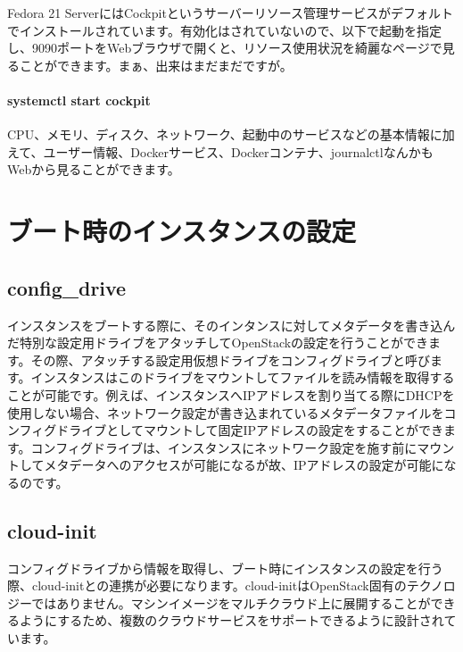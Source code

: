 \documentclass[9pt,b5paper,tombo,openany,dvipdfmx]{jsbook}
\begin{document}
Fedora 21 ServerにはCockpitというサーバーリソース管理サービスがデフォルトでインストールされています。有効化はされていないので、以下で起動を指定し、9090ポートをWebブラウザで開くと、リソース使用状況を綺麗なページで見ることができます。まぁ、出来はまだまだですが。

\subsubsection{systemctl start cockpit}

CPU、メモリ、ディスク、ネットワーク、起動中のサービスなどの基本情報に加えて、ユーザー情報、Dockerサービス、Dockerコンテナ、journalctlなんかもWebから見ることができます。

\stopcontents[sections]

\chapter{ブート時のインスタンスの設定}

\startcontents[sections]


\section{config\_drive}

インスタンスをブートする際に、そのインタンスに対してメタデータを書き込んだ特別な設定用ドライブをアタッチしてOpenStackの設定を行うことができます。その際、アタッチする設定用仮想ドライブをコンフィグドライブと呼びます。インスタンスはこのドライブをマウントしてファイルを読み情報を取得することが可能です。例えば、インスタンスへIPアドレスを割り当てる際にDHCPを使用しない場合、ネットワーク設定が書き込まれているメタデータファイルをコンフィグドライブとしてマウントして固定IPアドレスの設定をすることができます。コンフィグドライブは、インスタンスにネットワーク設定を施す前にマウントしてメタデータへのアクセスが可能になるが故、IPアドレスの設定が可能になるのです。

\section{cloud-init}

コンフィグドライブから情報を取得し、ブート時にインスタンスの設定を行う際、cloud-initとの連携が必要になります。cloud-initはOpenStack固有のテクノロジーではありません。マシンイメージをマルチクラウド上に展開することができるようにするため、複数のクラウドサービスをサポートできるように設計されています。
\end{document}
